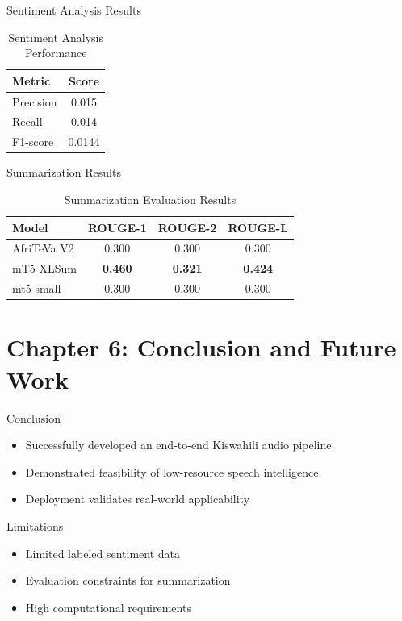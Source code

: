\documentclass{beamer}
\begin{document}
\begin{frame}{Sentiment Analysis Results}
\begin{table}
\centering
\begin{tabular}{lc}
\toprule
Metric & Score \\
\midrule
Precision & 0.015 \\
Recall & 0.014 \\
F1-score & 0.0144 \\
\bottomrule
\end{tabular}
\caption{Sentiment Analysis Performance}
\end{table}
\end{frame}

\begin{frame}{Summarization Results}
\begin{table}
\centering
\begin{tabular}{lccc}
\toprule
Model & ROUGE-1 & ROUGE-2 & ROUGE-L \\
\midrule
AfriTeVa V2 & 0.300 & 0.300 & 0.300 \\
mT5 XLSum & \textbf{0.460} & \textbf{0.321} & \textbf{0.424} \\
mt5-small & 0.300 & 0.300 & 0.300 \\
\bottomrule
\end{tabular}
\caption{Summarization Evaluation Results}
\end{table}
\end{frame}

\section{Chapter 6: Conclusion and Future Work}

\begin{frame}{Conclusion}
\begin{itemize}
    \item Successfully developed an end-to-end Kiswahili audio pipeline
    \item Demonstrated feasibility of low-resource speech intelligence
    \item Deployment validates real-world applicability
\end{itemize}
\end{frame}

\begin{frame}{Limitations}
\begin{itemize}
    \item Limited labeled sentiment data
    \item Evaluation constraints for summarization
    \item High computational requirements
\end{itemize}
\end{frame}
\end{document}
